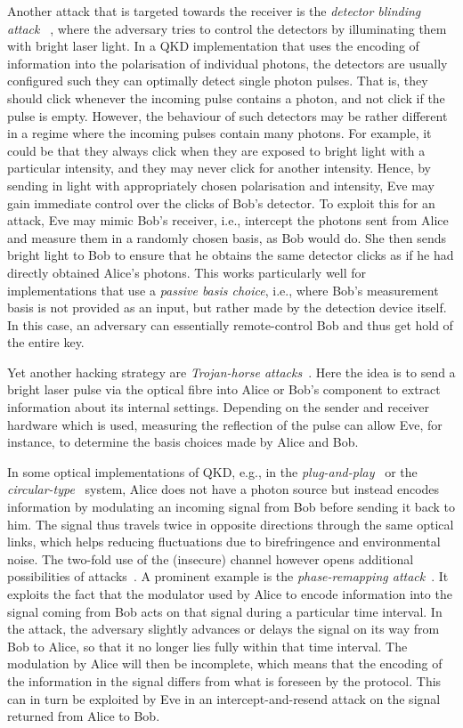 Another attack that is targeted towards the receiver is the \emph{detector blinding attack} ~\cite{Makarov2009,WKRFNW11,LWWESM10,GLLSKM11}, where the adversary tries to control the detectors by illuminating them with bright laser light.  In a QKD implementation that uses the encoding of information into the polarisation of individual photons, the detectors are usually configured such they can optimally detect single photon pulses. That is, they should click whenever the incoming pulse contains a photon, and not click if the pulse is empty.  However, the behaviour of such detectors may be rather different in a regime where the incoming pulses contain many photons. For example, it could be that they always click when they are exposed to bright light with a particular intensity, and they may never click for another intensity. Hence, by sending in light with appropriately chosen polarisation and intensity, Eve may gain immediate control over the clicks of Bob's detector. To exploit this for an attack, Eve may mimic Bob's receiver, i.e., intercept the photons sent from Alice and measure them in a randomly chosen basis, as Bob would do. She then sends bright light to Bob to ensure that he obtains the same detector clicks as if he had directly obtained Alice's photons. This works particularly well for implementations that use a \emph{passive basis choice}, i.e., where Bob's measurement basis is not  provided as an input, but rather made by the detection device itself. In this case, an adversary can essentially remote-control Bob and thus get hold of the entire key. 

Yet another hacking strategy are \emph{Trojan-horse attacks}~\cite{Vakhitov2001,GisinFaselKraus2006}. Here the idea is to send a bright laser pulse via the optical fibre into Alice or Bob's component to extract information about its internal settings. Depending on the sender and receiver hardware which is used, measuring the reflection of the pulse can allow Eve, for instance, to determine the basis choices made by Alice and Bob.

In some optical implementations of QKD, e.g., in the \emph{plug-and-play}~\cite{Muller97} or the \emph{circular-type}~\cite{Nishioka2002} system, Alice does not have a photon source but instead encodes information by modulating an incoming signal from Bob before sending it back to him. The signal thus travels twice in opposite directions through the same optical links, which helps reducing fluctuations due to birefringence  and environmental noise. The two-fold use of the (insecure) channel however opens additional possibilities of attacks~\cite{GisinFaselKraus2006}. A prominent example is the \emph{phase-remapping attack}~\cite{FQTL07,XQL10}. It exploits the fact that the modulator used by Alice to encode information into the signal coming from Bob acts on that signal during a particular time interval. In the attack, the adversary slightly advances or delays the signal on its way from Bob to Alice, so that it no longer lies fully within that time interval. The modulation by Alice will then be incomplete, which means that the encoding of the information in the signal differs from what is foreseen by the protocol. This can in turn be exploited by Eve in an intercept-and-resend attack on the signal returned from Alice to Bob. 


